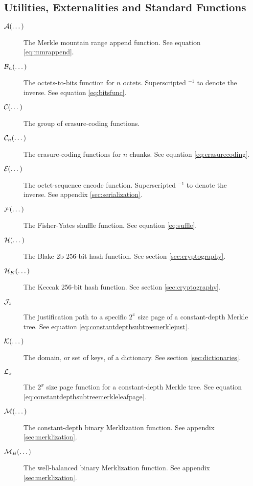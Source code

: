 \subsection{Utilities, Externalities and Standard Functions}

\begin{description}
  \item[$\mathcal{A}(\dots)$] The Merkle mountain range append function. See equation \ref{eq:mmrappend}.
  \item[$\mathcal{B}_{n}(\dots)$] The octets-to-bits function for $n$ octets. Superscripted ${}^{-1}$ to denote the inverse. See equation \ref{eq:bitsfunc}.
  \item[$\mathcal{C}(\dots)$] The group of erasure-coding functions.
  \item[$\mathcal{C}_{n}(\dots)$] The erasure-coding functions for $n$ chunks. See equation \ref{eq:erasurecoding}.
  \item[$\encode{\dots}$] The octet-sequence encode function. Superscripted ${}^{-1}$ to denote the inverse. See appendix \ref{sec:serialization}.
  \item[$\mathcal{F}(\dots)$] The Fisher-Yates shuffle function. See equation \ref{eq:suffle}.
  \item[$\blake{\dots}$] The Blake 2b 256-bit hash function. See section \ref{sec:cryptography}.
  \item[$\keccak{\dots}$] The Keccak 256-bit hash function. See section \ref{sec:cryptography}.
  \item[$\mathcal{J}_{x}$] The justification path to a specific $2^x$ size page of a constant-depth Merkle tree. See equation \ref{eq:constantdepthsubtreemerklejust}.
  \item[$\keys{\dots}$] The domain, or set of keys, of a dictionary. See section \ref{sec:dictionaries}.
  \item[$\mathcal{L}_{x}$] The $2^x$ size page function for a constant-depth Merkle tree. See equation \ref{eq:constantdepthsubtreemerkleleafpage}.
  \item[$\merklizecd{\dots}$] The constant-depth binary Merklization function. See appendix \ref{sec:merklization}.
  \item[$\merklizewb{\dots}$] The well-balanced binary Merklization function. See appendix \ref{sec:merklization}.

\end{description}

